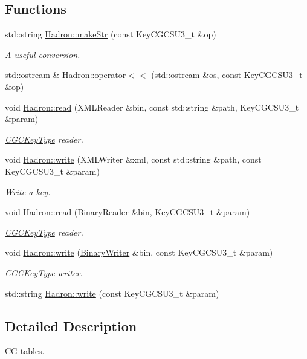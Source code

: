 \subsection*{Functions}
\begin{DoxyCompactItemize}
\item 
std\+::string \mbox{\hyperlink{namespaceHadron_a15300efff4b5c521fc84ba05f78c8710}{Hadron\+::make\+Str}} (const Key\+C\+G\+C\+S\+U3\+\_\+t \&op)
\begin{DoxyCompactList}\small\item\em A useful conversion. \end{DoxyCompactList}\item 
std\+::ostream \& \mbox{\hyperlink{namespaceHadron_a7351a4ec8398497cfa72ae6326e7d88c}{Hadron\+::operator$<$$<$}} (std\+::ostream \&os, const Key\+C\+G\+C\+S\+U3\+\_\+t \&op)
\item 
void \mbox{\hyperlink{namespaceHadron_a32f04cfa14604e9b40e037d78c0fad86}{Hadron\+::read}} (X\+M\+L\+Reader \&bin, const std\+::string \&path, Key\+C\+G\+C\+S\+U3\+\_\+t \&param)
\begin{DoxyCompactList}\small\item\em \mbox{\hyperlink{structHadron_1_1CGCKeyType}{C\+G\+C\+Key\+Type}} reader. \end{DoxyCompactList}\item 
void \mbox{\hyperlink{namespaceHadron_a1df6238e1c6eca70a3e05655f2680904}{Hadron\+::write}} (X\+M\+L\+Writer \&xml, const std\+::string \&path, const Key\+C\+G\+C\+S\+U3\+\_\+t \&param)
\begin{DoxyCompactList}\small\item\em Write a key. \end{DoxyCompactList}\item 
void \mbox{\hyperlink{namespaceHadron_ad89b4230ad913b777ca725473df40d15}{Hadron\+::read}} (\mbox{\hyperlink{classADATIO_1_1BinaryReader}{Binary\+Reader}} \&bin, Key\+C\+G\+C\+S\+U3\+\_\+t \&param)
\begin{DoxyCompactList}\small\item\em \mbox{\hyperlink{structHadron_1_1CGCKeyType}{C\+G\+C\+Key\+Type}} reader. \end{DoxyCompactList}\item 
void \mbox{\hyperlink{namespaceHadron_af206eaa349ec42352cb0a106dfd89c5b}{Hadron\+::write}} (\mbox{\hyperlink{classADATIO_1_1BinaryWriter}{Binary\+Writer}} \&bin, const Key\+C\+G\+C\+S\+U3\+\_\+t \&param)
\begin{DoxyCompactList}\small\item\em \mbox{\hyperlink{structHadron_1_1CGCKeyType}{C\+G\+C\+Key\+Type}} writer. \end{DoxyCompactList}\item 
std\+::string \mbox{\hyperlink{namespaceHadron_a4af69bc389ee44d25d1f3efa30042e4c}{Hadron\+::write}} (const Key\+C\+G\+C\+S\+U3\+\_\+t \&param)
\end{DoxyCompactItemize}


\subsection{Detailed Description}
CG tables. 

